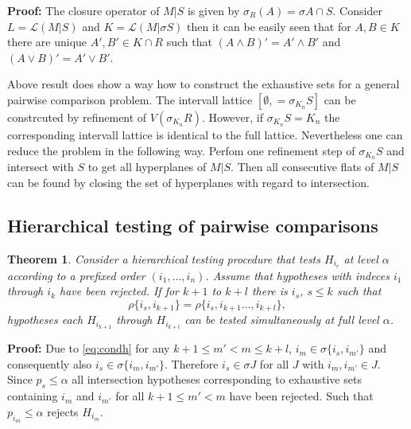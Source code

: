 \documentclass[a4paper,12pt]{article}
\newtheorem{theorem}{Theorem}
\newenvironment{proof}[1][Proof]{\noindent\textbf{#1:} }{}
\begin{document}
\begin{proof}
  The closure operator of $M|S$ is given by $\sigma_R(A) = \sigma A
  \cap S$. Consider $L = \mathcal{L}(M|S)$ and $K = \mathcal{L}(M|\sigma
  S)$ then it can be easily seen that for $A,B \in K$ there are unique $A',B'
  \in K \cap R$ such that $(A \land B)' = A' \land B'$ and $(A
  \lor B)' = A' \lor B'$. 
\end{proof}

Above result does show a way how to construct the exhaustive sets for
a general pairwise comparison problem. The intervall lattice
$[\emptyset,=\sigma_{K_n} S]$ can be constrcuted by refinement of
$V(\sigma_{K_n} R)$.  However, if $\sigma_{K_n} S = K_n$ the
corresponding intervall lattice is identical to the full
lattice. Nevertheless one can reduce the problem in the following
way. Perfom one refinement step of $\sigma_{K_n} S$ and intersect with
$S$ to get all hyperplanes of $M|S$. Then all consecutive flats of
$M|S$ can be found by closing the set of hyperplanes with regard to
intersection.

\subsection{Hierarchical testing of pairwise comparisons}

\begin{theorem}
  Consider a hierarchical testing procedure that tests $H_{i_r}$ at
  level $\alpha$ according to a prefixed order $(i_1,...,i_n)$. Assume
  that hypotheses with indeces $i_1$ through $i_k$ have been
  rejected. If for $k+1$ to $k+l$ there is $i_s$, $s \leq k$ such that
  \begin{equation}
    \label{eq:condh}
    \rho \{i_s,i_{k+1}\} = \rho \{i_s,i_{k+1}...,i_{k+l}\},
  \end{equation}
  hypotheses each $H_{i_{k+1}}$ through   $H_{i_{k+l}}$ can be tested
  simultaneously at full level $\alpha$. 
\end{theorem}

\begin{proof}
  Due to \ref{eq:condh} for any $k+1 \leq m' < m \leq k+l$, $i_m \in
  \sigma \{i_s,i_{m'}\}$ and consequently also $i_s \in \sigma
  \{i_m,i_{m'}\}$. Therefore $i_s \in \sigma J$ for all $J$ with
  $i_m,i_{m'} \in J$. Since $p_s \leq \alpha$ all intersection
  hypotheses corresponding to exhaustive sets containing $i_{m}$
  and $i_{m'}$ for all $k+1 \leq m' < m$ have been rejected. Such that
  $p_{i_{m}} \leq \alpha$ rejects $H_{i_{m}}$.
\end{proof}
\end{document}
